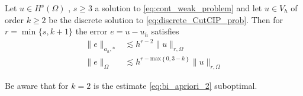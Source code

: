 \begin{theorem}
    \label{thm:apriori_result}
    Let $u \in H^{s}( \Omega ) $ , $s\ge 3$ a solution to \eqref{eq:cont_weak_problem} and let $u \in V_{h}$ of order $k\ge 2$ be the discrete solution to \eqref{eq:discrete_CutCIP_prob}. Then for $r = \min_{}\{s, k+1\} $ the error $e = u - u_{h}$ satisfies
    \begin{align}
        \label{eq:bi_apriori_1}
            \| e \|_{ a_{h},* }^{  } &\lesssim   h^{r-2} \| u \|_{ r,\Omega  }^{  }\\
        \label{eq:bi_apriori_2}
        \| e \|_{ \Omega  }^{  } &\lesssim   h^{r-\mathrm{max}\left\{ 0, 3-k \right\} } \| u \|_{ r,\Omega  }^{  }
    \end{align}

\end{theorem}
\begin{remark}
    Be aware that for $k=2$ is the estimate \eqref{eq:bi_apriori_2} suboptimal.
\end{remark}

